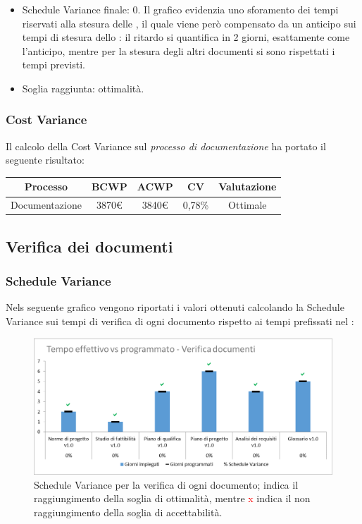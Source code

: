\begin{itemize}
	\item Schedule Variance finale: 0. 
	Il grafico evidenzia uno sforamento dei tempi riservati alla stesura delle \NdP{}, il quale viene però compensato da un anticipo sui tempi di stesura dello \SdF{}: il ritardo si quantifica in 2 giorni, esattamente come l'anticipo, mentre per la stesura degli altri documenti si sono rispettati i tempi previsti. 
	
	\item Soglia raggiunta: ottimalità.
\end{itemize}

\subsubsection{Cost Variance}
Il calcolo della Cost Variance sul \emph{processo di documentazione} ha portato il seguente risultato: 

{
\renewcommand{\arraystretch}{2}
\centering
\begin{tabular}{| c | c | c | c | c |}
	\hline
	\textbf{Processo} & \textbf{BCWP} & \textbf{ACWP} & \textbf{CV} & \textbf{Valutazione} \\
	\hline
	Documentazione & 3870\euro & 3840\euro & 0,78\% & Ottimale \\
	\hline
\end{tabular}

}


\subsection{Verifica dei documenti}
\subsubsection{Schedule Variance}
Nels seguente grafico vengono riportati i valori ottenuti calcolando la Schedule Variance sui tempi di verifica di ogni documento rispetto ai tempi prefissati nel \PdP{}:

\begin{figure}[h!]
	\centering
	\includegraphics[scale=0.75]{img/Grafici/SV-VerDocumenti.png}
	\caption{Schedule Variance per la verifica di ogni documento; \textcolor{green}{\checkmark} indica il raggiungimento della soglia di ottimalità, mentre \textcolor{red}{x} indica il non raggiungimento della soglia di accettabilità.}
	\label{fig:SV-VerDocumenti}
\end{figure}

